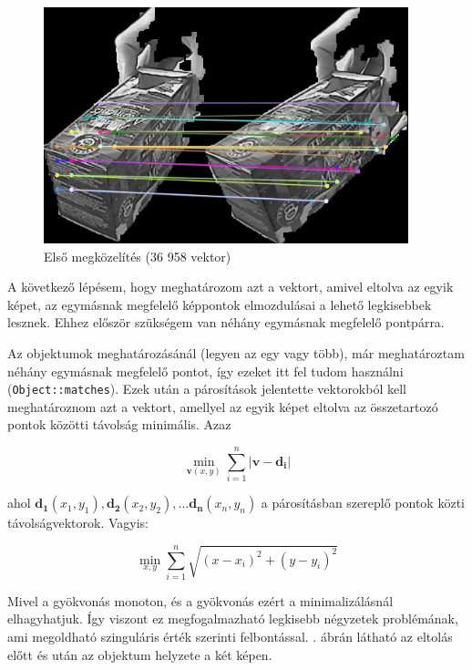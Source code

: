 \begin{figure}[tbh]
\centering
\includegraphics[width=300pt]{figures/vis_bad_0.png}
\caption{Első megközelítés (36 958 vektor) \label{fig:bad0}}
\end{figure}

A következő lépésem, hogy meghatározom azt a vektort, amivel eltolva az egyik képet, az egymásnak megfelelő képpontok elmozdulásai a lehető legkisebbek lesznek. Ehhez először szükségem van néhány egymásnak megfelelő pontpárra.

Az objektumok meghatározásánál (legyen az egy vagy több), már meghatároztam néhány egymásnak megfelelő pontot, így ezeket itt fel tudom használni (\texttt{Object::matches}). Ezek után a párosítások jelentette vektorokból kell meghatároznom azt a vektort, amellyel az egyik képet eltolva az összetartozó pontok közötti távolság minimális. Azaz

\[\min_{\mathbf{v}(x, y)} \sum_{i=1}^{n} |\mathbf{v} - \mathbf{d_i}|\]

ahol $\mathbf{d_1}(x_1, y_1), \mathbf{d_2}(x_2, y_2), \ldots \mathbf{d_n}(x_n, y_n)$ a párosításban szereplő pontok közti távolságvektorok. Vagyis:

\[\min_{x, y} \sum_{i=1}^{n} \sqrt{(x-x_i)^2 + (y-y_i)^2}\]

{\color{red}Mivel a gyökvonás monoton, és a gyökvonás ezért a minimalizálásnál elhagyhatjuk. Így viszont ez megfogalmazható legkisebb négyzetek problémának, ami megoldható szinguláris érték szerinti felbontással.} . ábrán látható az eltolás előtt és után az objektum helyzete a két képen.

